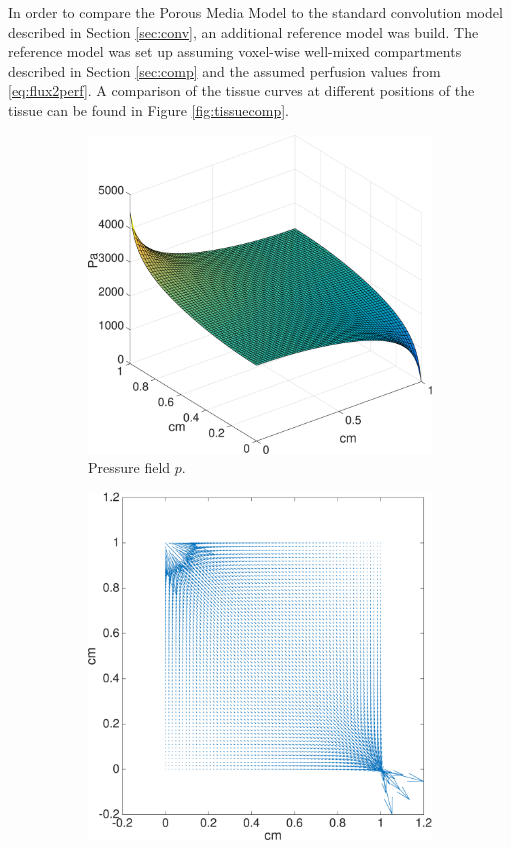 \documentclass[paper=a4, fontsize=12pt,parskip=half,headings=small]{scrartcl}
\begin{document}
	In order to compare the Porous Media Model to the standard convolution model described in Section \ref{sec:conv}, an additional reference model was build.
	The reference model was set up assuming voxel-wise well-mixed compartments described in Section \ref{sec:comp} and the assumed perfusion values from \eqref{eq:flux2perf}.
	A comparison of the tissue curves at different positions of the tissue can be found in Figure \ref{fig:tissuecomp}. 



	\begin{figure}[H]
		\centering
            \begin{subfigure}[b]{0.3\textwidth}
				\includegraphics[width=\textwidth]{figs/pressure.eps}
                \caption{Pressure field $p$.}
            \end{subfigure} 
            \begin{subfigure}[b]{0.3\textwidth}
				\includegraphics[width=\textwidth]{figs/flowQuiver.eps}

\end{subfigure}
\end{figure}
\end{document}
